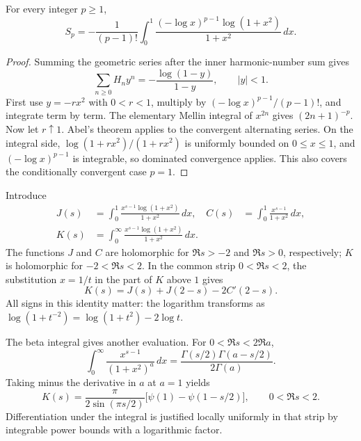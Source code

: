 \begin{lemma}\label{gau:moment}
For every integer $p\geq1$,
\begin{equation}\label{gau:moment-formula}
 S_p=-\frac1{(p-1)!}\int_0^1
       \frac{(-\log x)^{p-1}\log(1+x^2)}{1+x^2}\,dx.
\end{equation}
\end{lemma}
\begin{proof}
Summing the geometric series after the inner harmonic-number sum gives
\[
 \sum_{n\geq0}H_n y^n=-\frac{\log(1-y)}{1-y},\qquad |y|<1.
\]
First use $y=-r x^2$ with $0<r<1$, multiply by
$(-\log x)^{p-1}/(p-1)!$, and integrate term by term. The elementary
Mellin integral of $x^{2n}$ gives $(2n+1)^{-p}$.
Now let $r\uparrow1$. Abel's theorem applies to the convergent alternating
series. On the integral side,
$\log(1+rx^2)/(1+rx^2)$ is uniformly bounded on $0\leq x\leq1$,
and $(-\log x)^{p-1}$ is integrable, so dominated convergence applies.
This also covers the conditionally convergent case $p=1$.
\end{proof}

Introduce
\begin{align}
 J(s)&=\int_0^1\frac{x^{s-1}\log(1+x^2)}{1+x^2}\,dx,
 & C(s)&=\int_0^1\frac{x^{s-1}}{1+x^2}\,dx,\label{gau:mellin-defs}\\
 K(s)&=\int_0^\infty\frac{x^{s-1}\log(1+x^2)}{1+x^2}\,dx.
 \nonumber
\end{align}
The functions $J$ and $C$ are holomorphic for $\Re s>-2$ and $\Re s>0$,
respectively; $K$ is holomorphic for $-2<\Re s<2$.
In the common strip $0<\Re s<2$, the substitution $x=1/t$ in the
part of $K$ above $1$ gives
\begin{equation}\label{gau:reflection}
 K(s)=J(s)+J(2-s)-2C'(2-s).
\end{equation}
All signs in this identity matter: the logarithm transforms as
$\log(1+t^{-2})=\log(1+t^2)-2\log t$.

The beta integral gives another evaluation. For
$0<\Re s<2\Re a$,
\[
 \int_0^\infty\frac{x^{s-1}}{(1+x^2)^a}\,dx
 =\frac{\Gamma(s/2)\Gamma(a-s/2)}{2\Gamma(a)}.
\]
Taking minus the derivative in $a$ at $a=1$ yields
\begin{equation}\label{gau:complete-mellin}
 K(s)=\frac{\pi}{2\sin(\pi s/2)}
          \bigl[\psi(1)-\psi(1-s/2)\bigr],
 \qquad 0<\Re s<2.
\end{equation}
Differentiation under the integral is justified locally uniformly in that
strip by integrable power bounds with a logarithmic factor.

